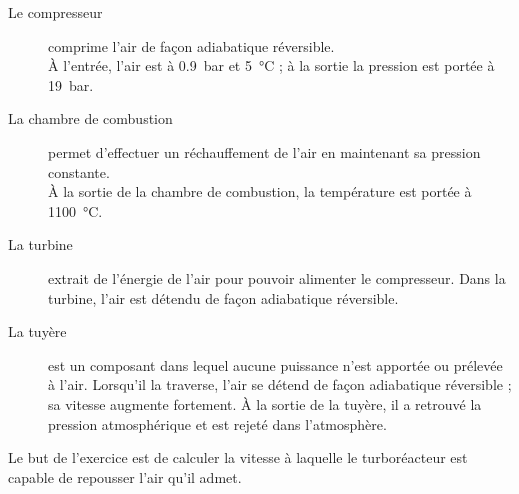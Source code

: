 	\begin{description}
		\item [Le compresseur] comprime l’air de façon adiabatique réversible.\\
			À l’entrée, l’air est à \SI{0,9}{\bar} et \SI{5}{\degreeCelsius} ; à la sortie la pression est portée à \SI{19}{\bar}. 
		\item [La chambre de combustion] permet d’effectuer un réchauffement de l’air en maintenant sa pression constante.\\
			À la sortie de la chambre de combustion, la température est portée à \SI{1100}{\degreeCelsius}.
		\item [La turbine] extrait de l’énergie de l’air pour pouvoir alimenter le compresseur. Dans la turbine, l’air est détendu de façon adiabatique réversible.
		\item [La tuyère] est un composant dans lequel aucune puissance n’est apportée ou prélevée à l’air. Lorsqu’il la traverse, l’air se détend de façon adiabatique réversible ; sa vitesse augmente fortement. À la sortie de la tuyère, il a retrouvé la pression atmosphérique et est rejeté dans l’atmosphère.
	\end{description}
	
	Le but de l’exercice est de calculer la vitesse à laquelle le turboréacteur est capable de repousser l’air qu’il admet.
	
	\pagebreak[1] %
	
